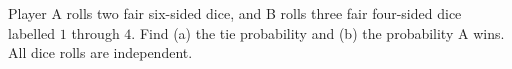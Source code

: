 Player A rolls two fair six-sided dice, and B rolls three fair four-sided dice labelled $1$ through $4$. Find (a) the tie probability and (b) the probability A wins. All dice rolls are independent.
